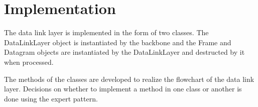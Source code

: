\section{Implementation}
The data link layer is implemented in the form of two classes. The DataLinkLayer
object is instantiated by the backbone and the Frame and Datagram objects are
instantiated by the DataLinkLayer and destructed by it when processed.


The methods of the classes are developed to realize the flowchart of the data
link layer. Decisions on whether to implement a method in one class or another
is done using the expert pattern.

